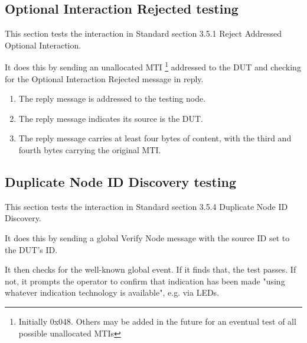 \documentclass[11pt]{article}
\begin{document}
\subsection{Optional Interaction Rejected testing}

This section tests the interaction in Standard section 3.5.1 Reject Addressed Optional Interaction.

It does this by sending an unallocated MTI
\footnote{Initially 0x048. Others may be added in the future for an eventual
    test of all possible unallocated MTIs}
addressed to the DUT and checking for the Optional Interaction Rejected 
message in reply.

    \begin{enumerate}
    \item The reply message is addressed to the testing node.
    \item The reply message indicates its source is the DUT.
    \item The reply message carries at least four bytes of content, with the 
            third and fourth bytes carrying the original MTI.
    \end{enumerate}

\subsection{Duplicate Node ID Discovery testing}

This section tests the interaction in Standard section 3.5.4 Duplicate Node ID Discovery.

It does this by sending a global Verify Node message with the source ID set to the DUT's ID.

It then checks for the well-known global event.  If it finds that, the test passes.
If not, it prompts the operator to confirm that indication has been made 
"using whatever indication technology is available", e.g. via LEDs.
\end{document}
